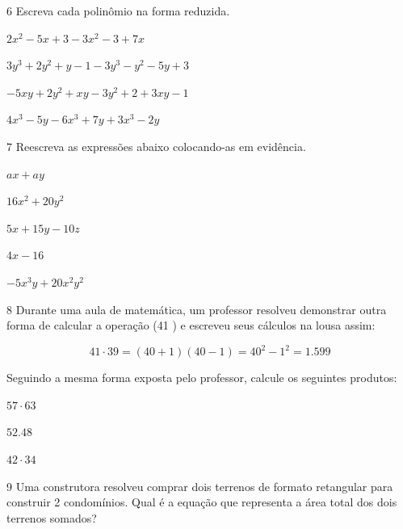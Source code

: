 \num{6} Escreva cada polinômio na forma reduzida.

\begin{escolha}
\item $2x^2 - 5x + 3 - 3x^2 - 3 + 7x$
\item $3y^3 + 2y^2 + y - 1 - 3y^3 - y^2 - 5y +3$
\item $-5xy + 2y^2 + xy - 3y^2 + 2 + 3xy - 1$
\item $4x^3 - 5y - 6x^3 + 7y + 3x^3 - 2y$
\end{escolha}


\num{7} Reescreva as expressões abaixo colocando-as em evidência.

\begin{escolha}
\item $ax + ay$
\item $16x^2 + 20y^2$
\item $5x + 15y - 10z$
\item $4x - 16$
\item $-5x^3y + 20x^2y^2$
\end{escolha}

\num{8} Durante uma aula de matemática, um professor resolveu demonstrar
outra forma de calcular a operação (41 ) e escreveu seus cálculos na
lousa assim:

$$41 \cdot 39 = (40 + 1) (40 - 1) = 40^2 - 1^2 = 1.599$$

Seguindo a mesma forma exposta pelo professor, calcule os seguintes
produtos:

\begin{escolha}
\item $57 \cdot 63$
\item $52. 48$
\item $42 \cdot 34$
\end{escolha}



\num{9} Uma construtora resolveu comprar dois terrenos de formato retangular
para construir 2 condomínios. Qual é a equação que representa a área
total dos dois terrenos somados?

